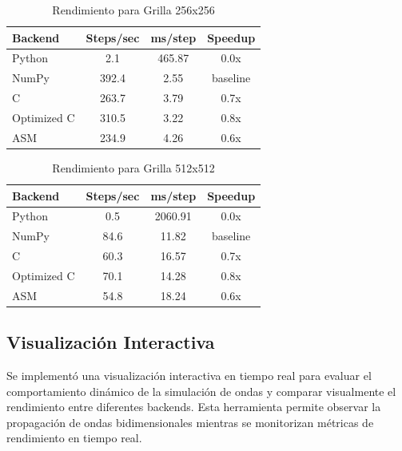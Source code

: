 \documentclass[a4paper]{article}
\begin{document}
\begin{table}[h]
    \centering
    \caption{Rendimiento para Grilla 256x256}
    \begin{tabular}{@{}lccc@{}}
        \toprule
        Backend     & Steps/sec & ms/step & Speedup  \\
        \midrule
        Python      & 2.1       & 465.87  & 0.0x     \\
        NumPy       & 392.4     & 2.55    & baseline \\
        C           & 263.7     & 3.79    & 0.7x     \\
        Optimized C & 310.5     & 3.22    & 0.8x     \\
        ASM         & 234.9     & 4.26    & 0.6x     \\
        \bottomrule
    \end{tabular}
    \label{tab:perf_256x256}
\end{table}

\begin{table}[h]
    \centering
    \caption{Rendimiento para Grilla 512x512}
    \begin{tabular}{@{}lccc@{}}
        \toprule
        Backend     & Steps/sec & ms/step & Speedup  \\
        \midrule
        Python      & 0.5       & 2060.91 & 0.0x     \\
        NumPy       & 84.6      & 11.82   & baseline \\
        C           & 60.3      & 16.57   & 0.7x     \\
        Optimized C & 70.1      & 14.28   & 0.8x     \\
        ASM         & 54.8      & 18.24   & 0.6x     \\
        \bottomrule
    \end{tabular}
    \label{tab:perf_512x512}
\end{table}

\subsection{Visualización Interactiva}

Se implementó una visualización interactiva en tiempo real para evaluar el comportamiento dinámico de la simulación de ondas y comparar visualmente el rendimiento entre diferentes backends. Esta herramienta permite observar la propagación de ondas bidimensionales mientras se monitorizan métricas de rendimiento en tiempo real.
\end{document}
